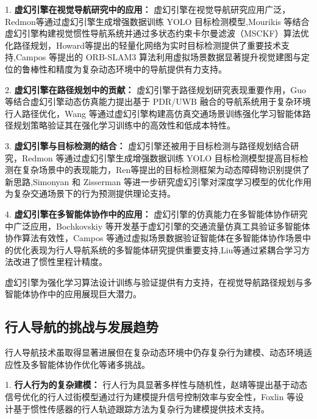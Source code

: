 1. \textbf{虚幻引擎在视觉导航研究中的应用：} 虚幻引擎在视觉导航研究应用广泛，Redmon等\cite{redmon2017yolo9000}通过虚幻引擎生成增强数据训练 YOLO 目标检测模型,Mourikis 等\cite{mourikis2007msckf}结合虚幻引擎构建视觉惯性导航系统并通过多状态约束卡尔曼滤波（MSCKF）算法优化路径规划，Howard等\cite{howard2017mobilenets}提出的轻量化网络为实时目标检测提供了重要技术支持,Campos 等\cite{campos2021orbslam3}提出的 ORB-SLAM3 算法利用虚拟场景数据显著提升视觉建图与定位的鲁棒性和精度为复杂动态环境中的导航提供有力支持。

2. \textbf{虚幻引擎在路径规划中的贡献：} 虚幻引擎于路径规划研究表现重要作用，Guo 等\cite{guo2020pdr}结合虚幻引擎动态仿真能力提出基于 PDR/UWB 融合的导航系统用于复杂环境行人路径优化，Wang 等\cite{wang2023llio}通过虚幻引擎构建高仿真交通场景训练强化学习智能体路径规划策略验证其在强化学习训练中的高效性和低成本特性。

3. \textbf{虚幻引擎与目标检测的结合：} 虚幻引擎还被用于目标检测与路径规划结合研究，Redmon 等\cite{redmon2017yolo9000}通过虚幻引擎生成增强数据训练 YOLO 目标检测模型提高目标检测在复杂场景中的表现能力，Ren等\cite{ren2017fasterrcnn}提出的目标检测框架为动态障碍物识别提供了新思路,Simonyan 和 Zisserman 等\cite{simonyan2014action}进一步研究虚幻引擎对深度学习模型的优化作用为复杂交通场景下的行为预测提供理论支持。 

4. \textbf{虚幻引擎在多智能体协作中的应用：} 虚幻引擎的仿真能力在多智能体协作研究中广泛应用，Bochkovskiy 等\cite{bochkovskiy2020yolov4}开发基于虚幻引擎的交通流量仿真工具验证多智能体协作算法有效性，Campos 等\cite{campos2021orbslam3}通过虚拟场景数据验证智能体在多智能体协作场景中的优化表现为行人导航系统的多智能体研究提供重要支持,Liu等\cite{liu2020tlio}通过紧耦合学习方法改进了惯性里程计精度。

虚幻引擎为强化学习算法设计训练与验证提供有力支持，在视觉导航路径规划与多智能体协作中的应用展现巨大潜力。

\subsection{行人导航的挑战与发展趋势}

行人导航技术虽取得显著进展但在复杂动态环境中仍存复杂行为建模、动态环境适应性及多智能体协作优化等诸多挑战。

1. \textbf{行人行为的复杂建模：} 行人行为具显著多样性与随机性，赵靖等\cite{zhao2014crossing}提出基于动态信号优化的行人过街模型通过行为建模提升信号控制效率与安全性，Foxlin 等\cite{foxlin2005tracking}设计基于惯性传感器的行人轨迹跟踪方法为复杂行为建模提供技术支持。

